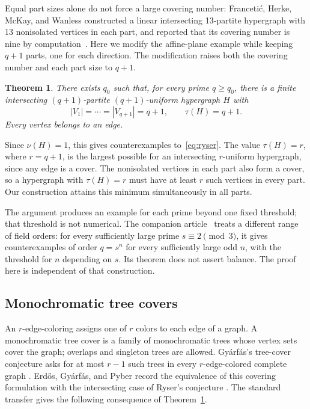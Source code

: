 \documentclass[11pt]{article}
\newtheorem{theorem}{Theorem}[section]
\theoremstyle{definition}
\theoremstyle{remark}
\begin{document}
Equal part sizes alone do not force a large covering number:
Franceti\'c, Herke, McKay, and Wanless constructed a linear intersecting
13-partite hypergraph with 13 nonisolated vertices in each part, and
reported that its covering number is nine by
computation~\cite[Section~3.1]{FranceticHerkeMcKayWanless2017}.
Here we modify the affine-plane example while keeping $q+1$ parts, one
for each direction. The modification raises both the covering number and
each part size to $q+1$.

\begin{theorem}\label{thm:main}
There exists $q_0$ such that, for every prime $q\ge q_0$, there is a
finite intersecting $(q+1)$-partite $(q+1)$-uniform hypergraph $H$ with
\[
 |V_1|=\cdots=|V_{q+1}|=q+1,
 \qquad \tau(H)=q+1.
\]
Every vertex belongs to an edge.
\end{theorem}

Since $\nu(H)=1$, this gives counterexamples to~\eqref{eq:ryser}.
The value $\tau(H)=r$, where $r=q+1$, is the largest possible for an
intersecting $r$-uniform hypergraph, since any edge is a cover. The
nonisolated vertices in each part also form a cover, so a hypergraph with
$\tau(H)=r$ must have at least $r$ such vertices in every part. Our
construction attains this minimum simultaneously in all parts.

The argument produces an example for each prime beyond one fixed
threshold; that threshold is not numerical.
The companion article~\cite[Theorem~1.1]{OpenAIExtension2026} treats a different
range of field orders: for every sufficiently large prime $s\equiv2
\pmod3$, it gives counterexamples of order $q=s^n$ for every sufficiently
large odd $n$, with the threshold for $n$ depending on $s$. Its theorem
does not assert balance. The proof here is independent of that
construction.

\subsection{Monochromatic tree covers}

An $r$-edge-coloring assigns one of $r$ colors to each edge of a graph.
A monochromatic tree cover is a family of monochromatic trees whose
vertex sets cover the graph; overlaps and singleton trees are allowed.
Gy\'arf\'as's tree-cover conjecture asks for at most $r-1$ such trees
in every $r$-edge-colored complete graph
\cite[Conjecture~1]{Milicevic2017}. Erd\H{o}s, Gy\'arf\'as, and Pyber
record the equivalence of this covering formulation with the
intersecting case of Ryser's conjecture
\cite[Section~3, after Theorem~2]{ErdosGyarfasPyber1991}. The standard
transfer gives the following consequence of Theorem~\ref{thm:main}.
\end{document}
